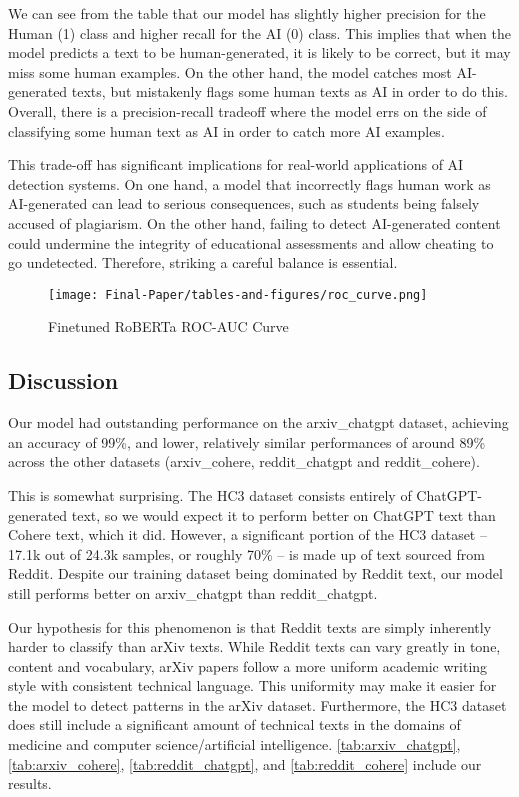 \documentclass[11pt]{article}
\begin{document}
We can see from the table that our model has slightly higher precision for the Human (1) class and higher recall for the AI (0) class. This implies that when the model predicts a text to be human-generated, it is likely to be correct, but it may miss some human examples. On the other hand, the model catches most AI-generated texts, but mistakenly flags some human texts as AI in order to do this. Overall, there is a precision-recall tradeoff where the model errs on the side of classifying some human text as AI in order to catch more AI examples.

This trade-off has significant implications for real-world applications of AI detection systems. On one hand, a model that incorrectly flags human work as AI-generated can lead to serious consequences, such as students being falsely accused of plagiarism. On the other hand, failing to detect AI-generated content could undermine the integrity of educational assessments and allow cheating to go undetected. Therefore, striking a careful balance is essential.

\begin{figure}[H]
    \centering
    \texttt{[image: Final-Paper/tables-and-figures/roc\_curve.png]}
    \caption{Finetuned RoBERTa ROC-AUC Curve}
    \label{fig:roberta_roc}
\end{figure}
\subsection{Discussion}

Our model had outstanding performance on the arxiv\_chatgpt dataset, achieving an accuracy of 99\%, and lower, relatively similar performances of around 89\% across the other datasets (arxiv\_cohere, reddit\_chatgpt and reddit\_cohere).

This is somewhat surprising. The HC3 dataset consists entirely of ChatGPT-generated text, so we would expect it to perform better on ChatGPT text than Cohere text, which it did. However, a significant portion of the HC3 dataset -- 17.1k out of 24.3k samples, or roughly 70\% -- is made up of text sourced from Reddit. Despite our training dataset being dominated by Reddit text, our model still performs better on  arxiv\_chatgpt than reddit\_chatgpt. 

Our hypothesis for this phenomenon is that Reddit texts are simply inherently harder to classify than arXiv texts. While Reddit texts can vary greatly in tone, content and vocabulary, arXiv papers follow a more uniform academic writing style with consistent technical language. This uniformity may make it easier for the model to detect patterns in the arXiv dataset. Furthermore, the HC3 dataset does still include a significant amount of technical texts in the domains of medicine and computer science/artificial intelligence. \autoref{tab:arxiv_chatgpt}, \autoref{tab:arxiv_cohere}, \autoref{tab:reddit_chatgpt}, and \autoref{tab:reddit_cohere} include our results.
\end{document}
